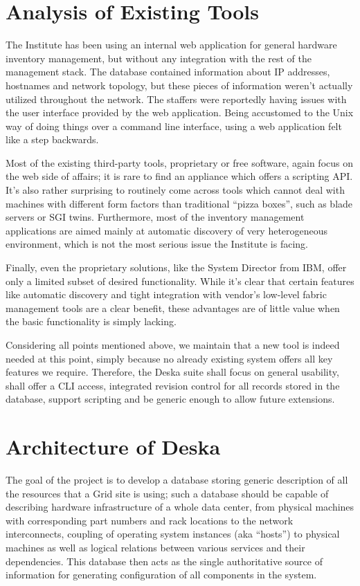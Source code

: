 \documentclass[a4paper]{jpconf}
\begin{document}
\section{Analysis of Existing Tools}

The Institute has been using an internal web application for general hardware inventory management, but without any integration with
the rest of the management stack.  The database contained information about IP addresses, hostnames and network topology, but these
pieces of information weren't actually utilized throughout the network.  The staffers were reportedly having issues with the user
interface provided by the web application.  Being accustomed to the Unix way of doing things over a command line interface, using a web
application felt like a step backwards.

Most of the existing third-party tools, proprietary or free software, again focus on the web side of affairs; it is rare to find an
appliance which offers a scripting API.  It's also rather surprising to routinely come across tools which cannot deal with machines
with different form factors than traditional ``pizza boxes'', such as blade servers or SGI twins.  Furthermore, most of the inventory
management applications are aimed mainly at automatic discovery of very heterogeneous environment, which is not the most serious issue
the Institute is facing.

Finally, even the proprietary solutions, like the System Director from IBM, offer only a limited subset of desired functionality.
While it's clear that certain features like automatic discovery and tight integration with vendor's low-level fabric management tools
are a clear benefit, these advantages are of little value when the basic functionality is simply lacking.

Considering all points mentioned above, we maintain that a new tool is indeed needed at this point, simply because no already existing
system offers all key features we require.  Therefore, the Deska suite shall focus on general usability, shall offer a CLI access,
integrated revision control for all records stored in the database, support scripting and be generic enough to allow future extensions.

\section{Architecture of Deska}

The goal of the project is to develop a database storing generic description of all the resources that a Grid site is using;
such a database should be capable of describing hardware infrastructure of a whole data center, from physical machines with
corresponding part numbers and rack locations to the network interconnects, coupling of operating system instances (aka ``hosts'') to
physical machines as well as logical relations between various services and their dependencies.  This database then acts as the
single authoritative source of information for generating configuration of all components in the system.
\end{document}
